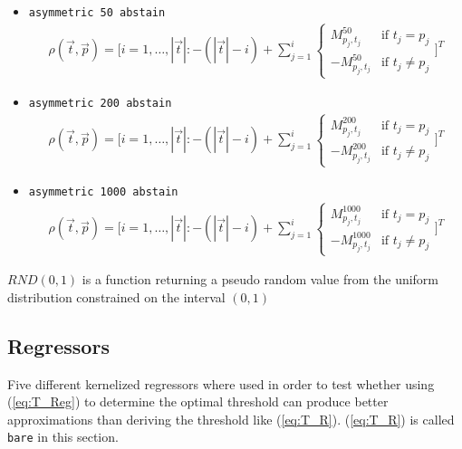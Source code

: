 \documentclass[twoside,11pt]{article}
\begin{document}
\begin{itemize}
  \item \texttt{asymmetric 50 abstain}
    \begin{align*}
      \rho(\vec{t}, \vec{p}) = \Bigg[
      i=1,\dots,|\vec{t}|: -(|\vec{t}| - i)+\sum_{j=1}^{i}
      \begin{cases}
        M^{50}_{p_j,t_j}  &\text{if } t_j = p_j \\
        -M^{50}_{p_j,t_j} &\text{if } t_j \neq p_j
      \end{cases} \Bigg]^T
    \end{align*}

  \item \texttt{asymmetric 200 abstain}
    \begin{align*}
      \rho(\vec{t}, \vec{p}) = \Bigg[
      i=1,\dots,|\vec{t}|: -(|\vec{t}| - i)+\sum_{j=1}^{i}
      \begin{cases}
        M^{200}_{p_j,t_j}  &\text{if } t_j = p_j \\
        -M^{200}_{p_j,t_j} &\text{if } t_j \neq p_j
      \end{cases} \Bigg]^T
    \end{align*}

  \item \texttt{asymmetric 1000 abstain}
    \begin{align*}
      \rho(\vec{t}, \vec{p}) = \Bigg[
      i=1,\dots,|\vec{t}|: -(|\vec{t}| - i)+\sum_{j=1}^{i}
      \begin{cases}
        M^{1000}_{p_j,t_j}  &\text{if } t_j = p_j \\
        -M^{1000}_{p_j,t_j} &\text{if } t_j \neq p_j
      \end{cases} \Bigg]^T
    \end{align*}

\end{itemize}

$RND(0,1)$ is a function returning a pseudo random value
from the uniform distribution constrained on the interval
$(0,1)$


\subsection{Regressors}
\label{subsec:reg}

Five different kernelized regressors where used in order
to test whether using (\ref{eq:T_Reg}) to determine the
optimal threshold can produce better approximations than
deriving the threshold like (\ref{eq:T_R}).
(\ref{eq:T_R}) is called \texttt{bare} in this section.
\end{document}
